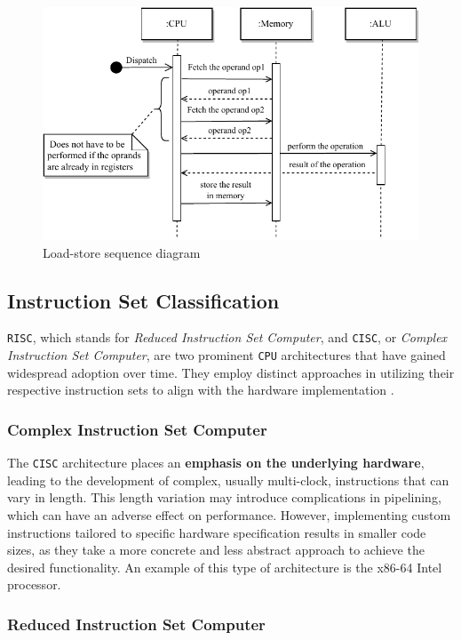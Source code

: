 \documentclass[english, ing, kiv, he, iso690numb, pdf]{fasthesis}
\begin{document}
	\begin{figure}[ht]
		\centering
		\includegraphics[width=.82\textwidth]{img/diagrams/load_store_sequence_diagram.pdf}
		\caption{Load-store sequence diagram}
		\label{Load-store sequence diagram}
	\end{figure}
	
	\subsection{Instruction Set Classification}
	
	\texttt{RISC}, which stands for \textit{Reduced Instruction Set Computer}, and \texttt{CISC}, or \textit{Complex Instruction Set Computer}, are two prominent \texttt{CPU} architectures that have gained widespread adoption over time. They employ distinct approaches in utilizing their respective instruction sets to align with the hardware implementation \cite{RISC-vs-CISC}.
	
	\subsubsection{Complex Instruction Set Computer}
	
	The \texttt{CISC} architecture places an \textbf{emphasis on the underlying hardware}, leading to the development of complex, usually multi-clock, instructions that can vary in length. This length variation may introduce complications in pipelining, which can have an adverse effect on performance. However, implementing custom instructions tailored to specific hardware specification results in smaller code sizes, as they take a more concrete and less abstract approach to achieve the desired functionality. An example of this type of architecture is the x86-64 Intel processor.
	
	\subsubsection{Reduced Instruction Set Computer}
	
\end{document}
